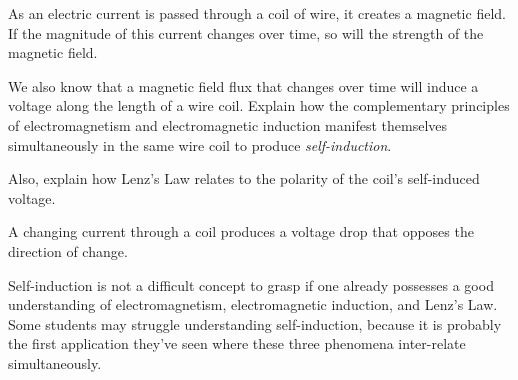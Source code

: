 

As an electric current is passed through a coil of wire, it creates a magnetic field.  If the magnitude of this current changes over time, so will the strength of the magnetic field.  

We also know that a magnetic field flux that changes over time will induce a voltage along the length of a wire coil.  Explain how the complementary principles of electromagnetism and electromagnetic induction manifest themselves simultaneously in the same wire coil to produce {\it self-induction}.

Also, explain how Lenz's Law relates to the polarity of the coil's self-induced voltage.







A changing current through a coil produces a voltage drop that opposes the direction of change.







Self-induction is not a difficult concept to grasp if one already possesses a good understanding of electromagnetism, electromagnetic induction, and Lenz's Law.  Some students may struggle understanding self-induction, because it is probably the first application they've seen where these three phenomena inter-relate simultaneously.




